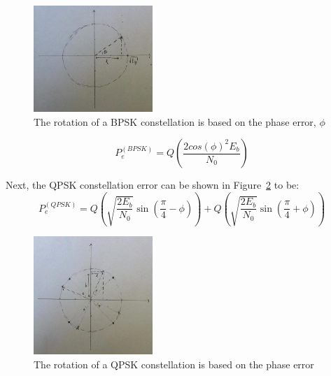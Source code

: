\documentclass[]{article}
\begin{document}
\begin{figure}[H]
\centering
\hspace*{-2cm}\includegraphics[width=0.4\textwidth]{bpskDraw.jpg}
\caption{The rotation of a BPSK constellation is based on the phase error, $\phi$ \label{fig:bpskDraw}}
\end{figure}

\begin{equation}
P_e^{\left(BPSK\right)} = Q\left(\frac{2cos\left(\phi\right)^{2}E_b}{N_0}\right)
\end{equation}

Next, the QPSK constellation error can be shown in Figure~\ref{fig:qpskDraw} to be:
\begin{equation}
P_e^{\left(QPSK \right)} = Q\left(\sqrt{\frac{2E_b}{N_0}}\sin\left(\frac{\pi}{4}-\phi\right)\right) + Q\left(\sqrt{\frac{2E_b}{N_0}}\sin\left(\frac{\pi}{4}+\phi\right)\right)
\end{equation}

\begin{figure}[H]
\centering
\hspace*{-2cm}\includegraphics[width=0.4\textwidth]{qpskDraw.jpg}
\caption{The rotation of a QPSK constellation is based on the phase error \label{fig:qpskDraw}}
\end{figure}
\end{document}
